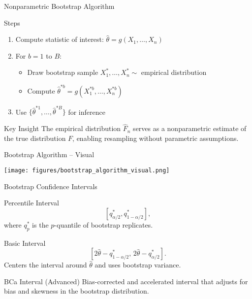 \begin{frame}{Nonparametric Bootstrap Algorithm}
  \begin{block}{Steps}
    \begin{enumerate}
      \item Compute statistic of interest: $\hat{\theta} = g(X_1, \dots, X_n)$
      \item For $b = 1$ to $B$:
      \begin{itemize}
        \item Draw bootstrap sample $X_1^*, \dots, X_n^* \sim$ empirical distribution
        \item Compute $\hat{\theta}^{*b} = g(X_1^{*b}, \dots, X_n^{*b})$
      \end{itemize}
      \item Use $\{\hat{\theta}^{*1}, \dots, \hat{\theta}^{*B}\}$ for inference
    \end{enumerate}
  \end{block}

  \begin{block}{Key Insight}
    The empirical distribution $\hat{F}_n$ serves as a nonparametric
    estimate of the true distribution $F$, enabling resampling without
    parametric assumptions.
  \end{block}
\end{frame}

\begin{frame}{Bootstrap Algorithm -- Visual}
  \begin{center}
    \texttt{[image: figures/bootstrap\_algorithm\_visual.png]}
  \end{center}
\end{frame}

\begin{frame}{Bootstrap Confidence Intervals}
  \begin{block}{Percentile Interval}
    \[\left[ q_{\alpha/2}^*, q_{1-\alpha/2}^* \right],\]
    where $q_p^*$ is the $p$-quantile of bootstrap replicates.
  \end{block}

  \begin{block}{Basic Interval}
    \[\left[ 2\hat{\theta} - q_{1-\alpha/2}^*, \, 2\hat{\theta} - q_{\alpha/2}^* \right].\]
    Centers the interval around $\hat{\theta}$ and uses bootstrap variance.
  \end{block}

  \begin{block}{BCa Interval (Advanced)}
    Bias-corrected and accelerated interval that adjusts for bias and
    skewness in the bootstrap distribution.
  \end{block}
\end{frame}

